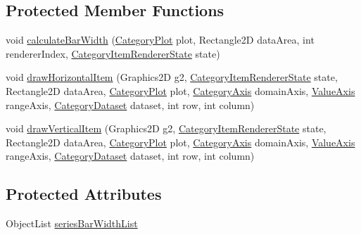 \subsection*{Protected Member Functions}
\begin{DoxyCompactItemize}
\item 
void \mbox{\hyperlink{classorg_1_1jfree_1_1chart_1_1renderer_1_1category_1_1_layered_bar_renderer_a5d34d4a85e65d129c8a74de81e3865b3}{calculate\+Bar\+Width}} (\mbox{\hyperlink{classorg_1_1jfree_1_1chart_1_1plot_1_1_category_plot}{Category\+Plot}} plot, Rectangle2D data\+Area, int renderer\+Index, \mbox{\hyperlink{classorg_1_1jfree_1_1chart_1_1renderer_1_1category_1_1_category_item_renderer_state}{Category\+Item\+Renderer\+State}} state)
\item 
void \mbox{\hyperlink{classorg_1_1jfree_1_1chart_1_1renderer_1_1category_1_1_layered_bar_renderer_aea1255c2a57a674a0bd4b6f2dd602155}{draw\+Horizontal\+Item}} (Graphics2D g2, \mbox{\hyperlink{classorg_1_1jfree_1_1chart_1_1renderer_1_1category_1_1_category_item_renderer_state}{Category\+Item\+Renderer\+State}} state, Rectangle2D data\+Area, \mbox{\hyperlink{classorg_1_1jfree_1_1chart_1_1plot_1_1_category_plot}{Category\+Plot}} plot, \mbox{\hyperlink{classorg_1_1jfree_1_1chart_1_1axis_1_1_category_axis}{Category\+Axis}} domain\+Axis, \mbox{\hyperlink{classorg_1_1jfree_1_1chart_1_1axis_1_1_value_axis}{Value\+Axis}} range\+Axis, \mbox{\hyperlink{interfaceorg_1_1jfree_1_1data_1_1category_1_1_category_dataset}{Category\+Dataset}} dataset, int row, int column)
\item 
void \mbox{\hyperlink{classorg_1_1jfree_1_1chart_1_1renderer_1_1category_1_1_layered_bar_renderer_a8db261847cf22386e6e4c4f86e6ee4d6}{draw\+Vertical\+Item}} (Graphics2D g2, \mbox{\hyperlink{classorg_1_1jfree_1_1chart_1_1renderer_1_1category_1_1_category_item_renderer_state}{Category\+Item\+Renderer\+State}} state, Rectangle2D data\+Area, \mbox{\hyperlink{classorg_1_1jfree_1_1chart_1_1plot_1_1_category_plot}{Category\+Plot}} plot, \mbox{\hyperlink{classorg_1_1jfree_1_1chart_1_1axis_1_1_category_axis}{Category\+Axis}} domain\+Axis, \mbox{\hyperlink{classorg_1_1jfree_1_1chart_1_1axis_1_1_value_axis}{Value\+Axis}} range\+Axis, \mbox{\hyperlink{interfaceorg_1_1jfree_1_1data_1_1category_1_1_category_dataset}{Category\+Dataset}} dataset, int row, int column)
\end{DoxyCompactItemize}
\subsection*{Protected Attributes}
\begin{DoxyCompactItemize}
\item 
Object\+List \mbox{\hyperlink{classorg_1_1jfree_1_1chart_1_1renderer_1_1category_1_1_layered_bar_renderer_a84081edfe7822ea0111651d4c082c4d1}{series\+Bar\+Width\+List}}
\end{DoxyCompactItemize}
